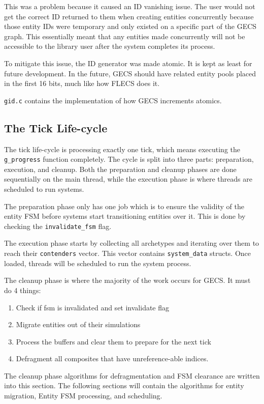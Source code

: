 This was a problem because it caused an ID vanishing issue. The user would not get the correct ID returned to them when creating entities concurrently because those entity IDs were temporary and only existed on a specific part of the GECS graph. This essentially meant that any entities made concurrently will not be accessible to the library user after the system completes its process.

To mitigate this issue, the ID generator was made atomic. It is kept as least for future development. In the future, GECS should have related entity pools placed in the first 16 bits, much like how FLECS does it.

\texttt{gid.c} contains the implementation of how GECS increments atomics.

\subsection{The Tick Life-cycle}
The tick life-cycle is processing exactly one tick, which means executing the \texttt{g\_progress} function completely. The cycle is split into three parts: preparation, execution, and cleanup. Both the preparation and cleanup phases are done sequentially on the main thread, while the execution phase is where threads are scheduled to run systems.

The preparation phase only has one job which is to ensure the validity of the entity FSM before systems start transitioning entities over it. This is done by checking the \texttt{invalidate\_fsm} flag.

The execution phase starts by collecting all archetypes and iterating over them to reach their \texttt{contenders} vector. This vector contains \texttt{system\_data} structs. Once loaded, threads will be scheduled to run the system process.

The cleanup phase is where the majority of the work occurs for GECS. It must do 4 things:
\begin{enumerate}
    \item Check if fsm is invalidated and set invalidate flag
    \item Migrate entities out of their simulations
    \item Process the buffers and clear them to prepare for the next tick
    \item Defragment all composites that have unreference-able indices.
\end{enumerate}

The cleanup phase algorithms for defragmentation and FSM clearance are written into this section. The following sections will contain the algorithms for entity migration, Entity FSM processing, and scheduling.

